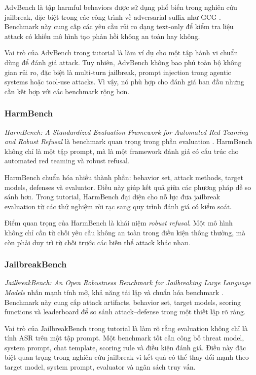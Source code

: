 AdvBench là tập harmful behaviors được sử dụng phổ biến trong nghiên cứu
jailbreak, đặc biệt trong các công trình về adversarial suffix như GCG
\cite{zou2023universal}. Benchmark này cung cấp các yêu cầu rủi ro dạng
text-only để kiểm tra liệu attack có khiến mô hình tạo phản hồi không an
toàn hay không.

Vai trò của AdvBench trong tutorial là làm ví dụ cho một tập hành vi chuẩn
dùng để đánh giá attack. Tuy nhiên, AdvBench không bao phủ toàn bộ không
gian rủi ro, đặc biệt là multi-turn jailbreak, prompt injection trong
agentic systems hoặc tool-use attacks. Vì vậy, nó phù hợp cho đánh giá
ban đầu nhưng cần kết hợp với các benchmark rộng hơn.

\subsubsection{HarmBench}

\textit{HarmBench: A Standardized Evaluation Framework for Automated Red
Teaming and Robust Refusal} là benchmark quan trọng trong phần evaluation
\cite{mazeika2024harmbench}. HarmBench không chỉ là một tập prompt, mà là
một framework đánh giá có cấu trúc cho automated red teaming và robust
refusal.

HarmBench chuẩn hóa nhiều thành phần: behavior set, attack methods, target
models, defenses và evaluator. Điều này giúp kết quả giữa các phương pháp
dễ so sánh hơn. Trong tutorial, HarmBench đại diện cho nỗ lực đưa
jailbreak evaluation từ các thử nghiệm rời rạc sang quy trình đánh giá có
kiểm soát.

Điểm quan trọng của HarmBench là khái niệm \textit{robust refusal}. Một mô
hình không chỉ cần từ chối yêu cầu không an toàn trong điều kiện thông
thường, mà còn phải duy trì từ chối trước các biến thể attack khác nhau.

\subsubsection{JailbreakBench}

\textit{JailbreakBench: An Open Robustness Benchmark for Jailbreaking Large
Language Models} nhấn mạnh tính mở, khả năng tái lập và chuẩn hóa
benchmark \cite{chao2024jailbreakbench}. Benchmark này cung cấp attack
artifacts, behavior set, target models, scoring functions và leaderboard để
so sánh attack--defense trong một thiết lập rõ ràng.

Vai trò của JailbreakBench trong tutorial là làm rõ rằng evaluation không
chỉ là tính ASR trên một tập prompt. Một benchmark tốt cần công bố threat
model, system prompt, chat template, scoring rule và điều kiện đánh giá.
Điều này đặc biệt quan trọng trong nghiên cứu jailbreak vì kết quả có thể
thay đổi mạnh theo target model, system prompt, evaluator và ngân sách
truy vấn.

